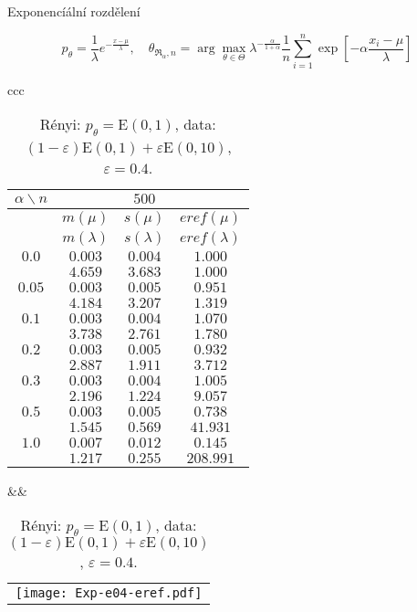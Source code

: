 \documentclass[11pt,a4paper]{beamer}
\newcommand{\amtiT}{\arg \max_{\theta \in \Theta}}
\begin{document}
\begin{frame}{Exponencíální rozdělení} %

{\footnotesize	\[ p_\theta = \frac{1}{\lambda} e^{-\frac{x-\mu}{\lambda}  }, \quad \theta_{\mathfrak{R}_\alpha,n} = \amtiT \lambda^{-\frac{\alpha}{1+\alpha}} \frac{1}{n}\sum_{i=1}^n \exp \left[-\alpha\frac{x_i-\mu}{\lambda} \right] \]}
\begin{table}[htb] \tiny
\begin{center}
\begin{tabular}{ccc}
	\begin{tabular}{|c|ccc|}
	\hline
	$\alpha\backslash n$ && $500$ & \\
	\hline
	& $m(\mu)$ & $s(\mu)$ & $eref(\mu)$ \\
	& $m(\lambda)$ & $s(\lambda)$ & $eref(\lambda)$ \\
	\hline
	$0.0$ & $ 0.003 $ & $ 0.004 $ & $ 1.000 $\\
	 & $ 4.659 $ & $ 3.683 $ & $ 1.000 $\\
	\hline
	$0.05$ & $ 0.003 $ & $ 0.005 $ & $ 0.951 $\\
	 & $ 4.184 $ & $ 3.207 $ & $ 1.319 $\\
	\hline
	$0.1$ & $ 0.003 $ & $ 0.004 $ & $ 1.070 $\\
	 & $ 3.738 $ & $ 2.761 $ & $ 1.780 $\\
	\hline
	$0.2$ & $ 0.003 $ & $ 0.005 $ & $ 0.932 $\\
	 & $ 2.887 $ & $ 1.911 $ & $ 3.712 $\\
	\hline
	$0.3$ & $ 0.003 $ & $ 0.004 $ & $ 1.005 $\\
	 & $ 2.196 $ & $ 1.224 $ & $ 9.057 $\\
	\hline
	$0.5$ & $ 0.003 $ & $ 0.005 $ & $ 0.738 $\\
	 & $ 1.545 $ & $ 0.569 $ & $ 41.931 $\\
	\hline
	$1.0$ & $ 0.007 $ & $ 0.012 $ & $ 0.145 $\\
	 & $ 1.217 $ & $ 0.255 $ & $ 208.991 $\\
	\hline
	\end{tabular}
&&
	\begin{tabular}{c}
		\texttt{[image: Exp-e04-eref.pdf]}
	\end{tabular}
\\
\end{tabular}
\end{center}
\caption{R\'{e}nyi: $p_\theta = \mathrm{E}(0,1)$, data: $(1-\varepsilon)\mathrm{E}(0,1) + \varepsilon \mathrm{E}(0,10)$, $\varepsilon =  0.4$.}
\label{tabJK:exponential-eref}
\end{table}	
\end{frame}
\end{document}
